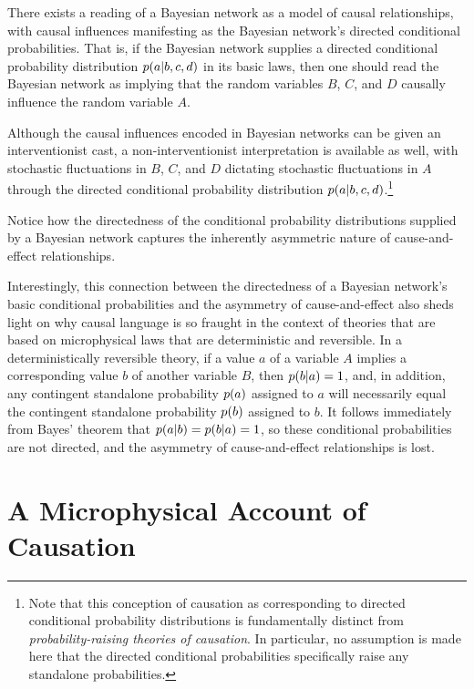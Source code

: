 \documentclass[12pt,english,prl,superscriptaddress,nobibnotes,nofootinbib]{revtex4-2}
\let\originalleft\left
\let\originalright\right
\renewcommand{\left}{\mathopen{}\mathclose\bgroup\originalleft}
\renewcommand{\right}{\aftergroup\egroup\originalright}
\begin{document}
There exists a reading of a Bayesian network as a model of causal
relationships, with causal influences manifesting as the Bayesian
network's directed conditional probabilities. That is, if the Bayesian
network supplies a directed conditional probability distribution $p\left(a\given b,c,d\right)$
in its basic laws, then one should read the Bayesian network as implying
that the random variables $B$, $C$, and $D$ causally influence
the random variable $A$.

Although the causal influences encoded in Bayesian networks can be
given an interventionist cast, a non-interventionist interpretation
is available as well, with stochastic fluctuations in $B$, $C$,
and $D$ dictating stochastic fluctuations in $A$ through the directed
conditional probability distribution $p\left(a\given b,c,d\right)$.\footnote{Note that this conception of causation as corresponding to directed
conditional probability distributions is fundamentally distinct from
\emph{probability-raising theories of causation}. In particular,
no assumption is made here that the directed conditional probabilities
specifically raise any standalone probabilities.}

Notice how the directedness of the conditional probability distributions
supplied by a Bayesian network captures the inherently asymmetric
nature of cause-and-effect relationships.

Interestingly, this connection between the directedness of a Bayesian
network's basic conditional probabilities and the asymmetry of cause-and-effect
also sheds light on why causal language is so fraught in the context
of theories that are based on microphysical laws that are deterministic
and reversible. In a deterministically reversible theory, if a value
$a$ of a variable $A$ implies a corresponding value $b$ of another
variable $B$, then $p\left(b\given a\right)=1$, and, in addition,
any contingent standalone probability $p\left(a\right)$ assigned
to $a$ will necessarily equal the contingent standalone probability
$p\left(b\right)$ assigned to $b$. It follows immediately from Bayes'
theorem that $p\left(a\given b\right)=p\left(b\given a\right)=1$,
so these conditional probabilities are not directed, and the asymmetry
of cause-and-effect relationships is lost.

\section{A Microphysical Account of Causation\label{sec:A-Microphysical-Account-of-Causation}}
\end{document}
